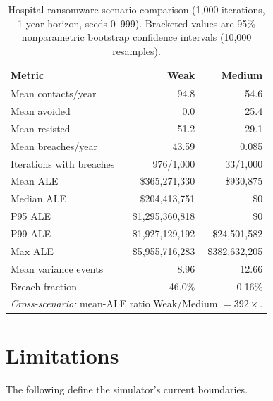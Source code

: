 \documentclass[11pt,a4paper]{article}
\begin{document}
\begin{table}[htbp]
\centering
\caption{Hospital ransomware scenario comparison (1{,}000 iterations, 1-year horizon, seeds 0--999). Bracketed values are 95\% nonparametric bootstrap confidence intervals (10{,}000 resamples).}
\label{tab:scenarios}
\small
\begin{tabular}{l r r}
\toprule
\textbf{Metric} & \textbf{Weak} & \textbf{Medium} \\
\midrule
Mean contacts/year      & 94.8  & 54.6 \\
Mean avoided            & 0.0   & 25.4 \\
Mean resisted           & 51.2  & 29.1 \\
Mean breaches/year      & 43.59 & 0.085 \\
Iterations with breaches & 976/1{,}000 & 33/1{,}000 \\
Mean ALE                & \$365{,}271{,}330 & \$930{,}875 \\
Median ALE              & \$204{,}413{,}751  & \$0 \\
P95 ALE                 & \$1{,}295{,}360{,}818  & \$0 \\
P99 ALE                 & \$1{,}927{,}129{,}192  & \$24{,}501{,}582 \\
Max ALE                 & \$5{,}955{,}716{,}283  & \$382{,}632{,}205 \\
Mean variance events    & 8.96   & 12.66 \\
Breach fraction         & 46.0\% & 0.16\% \\
\midrule
\multicolumn{3}{l}{\textit{Cross-scenario:} mean-ALE ratio Weak/Medium $= 392\times$.} \\
\bottomrule
\end{tabular}
\end{table}


\section{Limitations}
\label{sec:knownlim}

The following define the simulator's current boundaries.
\end{document}
